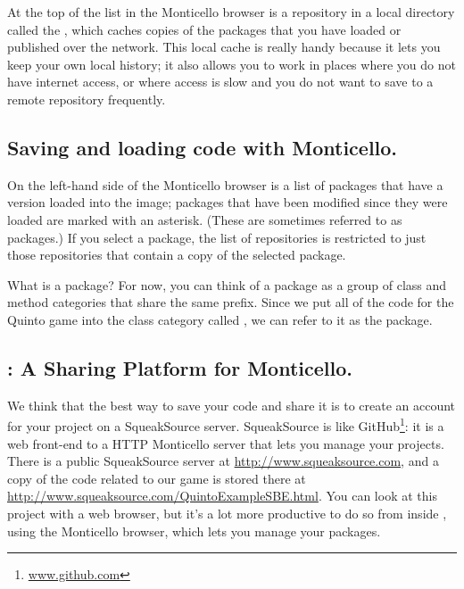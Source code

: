 \documentclass[a4paper,10pt,twoside]{book}
\begin{document}
At the top of the list in the Monticello browser is a repository in a local directory called the , which caches copies of the packages that you have loaded or published over the network. This local cache is really handy because it lets you keep your own local history; it also allows you to work in places where you do not have internet access, or where access is slow and you do not want to save to a remote repository frequently.


\subsection{Saving and loading code with Monticello.}
On the left-hand side of the Monticello browser is a list of packages that have a version loaded into the image; packages that have been modified since they were loaded are marked with an asterisk.  (These are sometimes referred to as  packages.)  If you select a package, the list of repositories is restricted to just those repositories that contain a copy of the selected package.

What is a package?  For now, you can think of a package as a group of  class and method categories that share the same prefix.  Since we put all of the code for the Quinto game into the class category called , we can refer to it as the  package.


\subsection{: A Sharing Platform for Monticello.} 
We think that the best way to save your code and share it is to create an account for your project on a SqueakSource server. 
SqueakSource is like GitHub\footnote{\url{www.github.com}}: it is a web front-end to a HTTP Monticello server that lets you manage your projects.
There is a public SqueakSource server at \url{http://www.squeaksource.com}, and a copy of the code related to our game is stored there at \url{http://www.squeaksource.com/QuintoExampleSBE.html}. You can look at this project with a web browser, but it's a lot more productive to do so from inside \squeak, using the Monticello browser, which lets you manage your packages.
\end{document}
